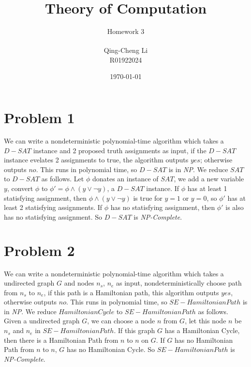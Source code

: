 \documentclass[11pt]{article}
\title{\textbf{Theory of Computation}}
\author{Homework 3\\
					\\
		Qing-Cheng Li\\
		R01922024}
\date{\today}
\begin{document}
\maketitle
\section{Problem 1}
We can write a nondeterministic polynomial-time algorithm which takes a $D-SAT$ instance and 2 proposed truth assignments as input, if the $D-SAT$ instance evelates 2 assignments to true, the algorithm outputs $yes$; otherwise outputs $no$. This runs in polynomial time, so $D-SAT$ is in \emph{NP}. We reduce $SAT$ to $D-SAT$ as follows. Let $\phi$ donates an instance of $SAT$, we add a new variable $y$, convert $\phi$ to $\phi' = \phi \wedge (y \vee \neg y)$, a $D-SAT$ instance. If $\phi$ has at least 1 statisfying assignment, then $\phi \wedge (y \vee \neg y)$ is true for $y=1$ or $y=0$, so $\phi'$ has at least 2 statisfying assignments. If $\phi$ has no statisfying assignment, then $\phi'$ is also has no statisfying assignment. So $D-SAT$ is \emph{NP-Complete}.

\section{Problem 2}
We can write a nondeterministic polynomial-time algorithm which takes a undirected graph $G$ and nodes $n_s$, $n_e$ as input, nondeterministically choose path from $n_s$ to $n_e$, if this path is a Hamiltonian path, this algorithm outputs $yes$, otherwise outputs $no$. This runs in polynomial time, so $SE-Hamiltonian Path$ is in \emph{NP}. We reduce $Hamiltonian Cycle$ to $SE-Hamiltonian Path$ as follows. Given a undirected graph $G$, we can choose a node $n$ from $G$, let this node $n$ be $n_s$ and $n_e$ in $SE-Hamiltonian Path$. If this graph $G$ has a Hamiltonian Cycle, then there is a Hamiltonian Path from $n$ to $n$ on $G$. If $G$ has no Hamiltonian Path from $n$ to $n$, $G$ has no Hamiltonian Cycle. So $SE-Hamiltonian Path$ is \emph{NP-Complete}. 
\end{document}
